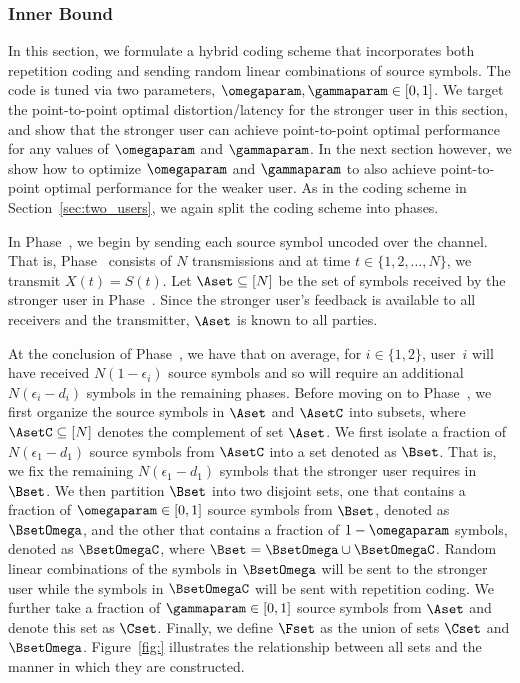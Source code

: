 \subsubsection{Inner Bound}
\label{subsubsec:inner_bound}

In this section, we formulate a hybrid coding scheme that incorporates both repetition coding and sending random linear combinations of source symbols.  The code is tuned via two parameters, $\omegaparam, \gammaparam \in [0, 1]$.  We target the point-to-point optimal distortion/latency for the stronger user in this section, and show that the stronger user can achieve point-to-point optimal performance for any values of $\omegaparam$ and $\gammaparam$.  In the next section however, we show how to optimize $\omegaparam$ and $\gammaparam$ to also achieve point-to-point optimal performance for the weaker user.  As in the coding scheme in Section~\ref{sec:two_users}, we again split the coding scheme into phases.  

In Phase~, we begin by sending each source symbol uncoded over the channel.  That is, Phase~ consists of $N$ transmissions and at time $t \in \{1, 2, \ldots, N\}$, we transmit $X(t) = S(t)$.  Let $\Aset \subseteq [N]$ be the set of symbols received by the stronger user in Phase~.  Since the stronger user's feedback is available to all receivers and the transmitter, $\Aset$ is known to all parties.  

At the conclusion of Phase~, we have that on average, for $i \in \{1, 2\}$, user~$i$ will have received $N(1 - \epsilon_i)$ source symbols and so will require an additional $N(\epsilon_i - d_i)$ symbols in the remaining phases.   Before moving on to Phase~, we first organize the source symbols in $\Aset$ and $\AsetC$ into subsets, where $\AsetC \subseteq [N]$ denotes the complement of set $\Aset$. We first isolate a fraction of $N(\epsilon_1 - d_1)$ source symbols from $\AsetC$ into a set denoted as $\Bset$.  That is, we fix the remaining $N(\epsilon_1 - d_1)$ symbols that the stronger user requires in $\Bset$.  We then partition $\Bset$ into two disjoint sets, one that contains a fraction of $\omegaparam \in [0, 1]$ source symbols from $\Bset$, denoted as $\BsetOmega$, and the other that contains a fraction of $1 - \omegaparam$ symbols, denoted as $\BsetOmegaC$, where $\Bset = \BsetOmega \cup \BsetOmegaC$.  Random linear combinations of the symbols in $\BsetOmega$ will be sent to the stronger user while the symbols in $\BsetOmegaC$ will be sent with repetition coding.  We further take a fraction of $\gammaparam \in [0, 1]$ source symbols from $\Aset$ and denote this set as $\Cset$.  Finally, we define $\Fset$ as the union of sets $\Cset$ and $\BsetOmega$.  Figure~\ref{fig:} illustrates the relationship between all sets and the manner in which they are constructed.

